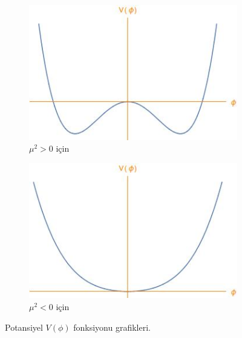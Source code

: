 \begin{figure}
\begin{minipage}{\linewidth}
      \centering
      \begin{minipage}{0.45\linewidth}
          \begin{figure}[H]
              \includegraphics[width=\linewidth]{higgs}
              \caption{$\mu^{2} > 0$ için}
          \end{figure}
      \end{minipage}
      \hspace{0.05\linewidth}
      \begin{minipage}{0.45\linewidth}
          \begin{figure}[H]
              \includegraphics[width=\linewidth]{higgs2}
              \caption{$\mu^{2} < 0$ için}
          \end{figure}
      \end{minipage}
  \end{minipage}
  \caption{Potansiyel $V(\phi)$ fonksiyonu grafikleri.}
  \label{higgspot}
\end{figure}
